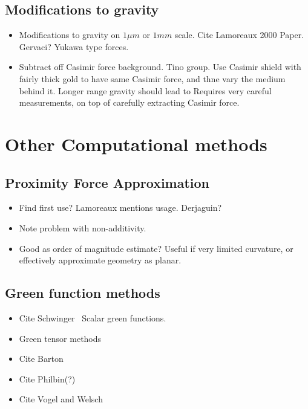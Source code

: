 \subsection{Modifications to gravity}

\begin{itemize}
\item Modifications to gravity on $1\mu m$ or $1mm$ scale.  Cite Lamoreaux 2000 Paper.  Gervaci?
Yukawa type forces.  
\item Subtract off Casimir force background.
  Tino group.
  Use Casimir shield with fairly thick gold to have same Casimir force, and thne vary the medium behind it.
  Longer range gravity should lead to 
Requires very careful measurements, on top of carefully extracting Casimir force.   
\end{itemize}

\section{Other Computational methods}

\subsection{Proximity Force Approximation}

\begin{itemize}
\item Find first use?  Lamoreaux mentions usage.  Derjaguin?\cite{Derjaguin1956}
\item Note problem with non-additivity. 
\item Good as order of magnitude estimate?  
Useful if very limited curvature, or effectively approximate geometry as planar.  
\end{itemize}

\subsection{Green function methods}

\begin{itemize}
\item Cite Schwinger~\cite{Schwinger1978, Milton1978}  Scalar green functions.  
\item Green tensor methods
\item Cite Barton
\item Cite Philbin(?)
\item Cite Vogel and Welsch
\end{itemize}

